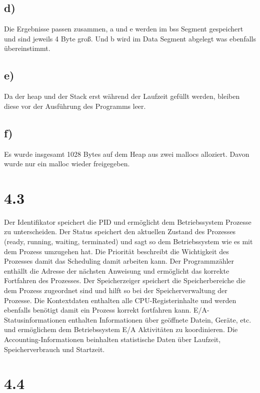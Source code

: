 \documentclass[a4paper,12pt]{article}
\begin{document}
\subsection*{d)}

Die Ergebnisse passen zusammen, a und e werden im bss Segment gespeichert und sind jeweils 4 Byte groß. Und b wird im Data Segment abgelegt was ebenfalls
übereinstimmt.

\subsection*{e)}

Da der heap und der Stack erst während der Laufzeit gefüllt werden, bleiben diese vor der Ausführung des Programms leer.

\subsection*{f)}

Es wurde insgesamt 1028 Bytes auf dem Heap aus zwei mallocs alloziert. Davon wurde nur ein malloc wieder freigegeben.

\section*{4.3}

Der Identifikator speichert die PID und ermöglicht dem Betriebssystem Prozesse zu unterscheiden.
Der Status speichert den aktuellen Zustand des Prozesses (ready, running, waiting, terminated) und sagt so dem Betriebssystem wie es mit dem
Prozess umzugehen hat.
Die Priorität beschreibt die Wichtigkeit des Prozesses damit das Scheduling damit arbeiten kann.
Der Programmzähler enthällt die Adresse der nächsten Anweisung und ermöglicht das korrekte Fortfahren des Prozesses.
Der Speicherzeiger speichert die Speicherbereiche die dem Prozess zugeordnet sind und hilft so bei der Speicherverwaltung der Prozesse.
Die Kontextdaten enthalten alle CPU-Registerinhalte und werden ebenfalls benötigt damit ein Prozess korrekt fortfahren kann.
E/A-Statusinformationen enthalten Informationen über geöffnete Datein, Geräte, etc. und ermöglichem dem Betriebssystem E/A Aktivitäten zu koordinieren.
Die Accounting-Informationen beinhalten statistische Daten über Laufzeit, Speicherverbrauch und Startzeit.

\section*{4.4}
\end{document}
